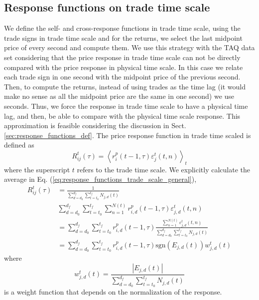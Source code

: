 \subsection{Response functions on trade time scale}
\label{subsec:response_function_trade}

We define the self- and cross-response functions in trade time scale, using the
trade signs in trade time scale and for the returns, we select the last
midpoint price of every second and compute them. We use this strategy with the
TAQ data set considering that the price response in trade time scale can not
be directly compared with the price response in physical time scale. In this
case we relate each trade sign in one second with the midpoint price of the
previous second. Then, to compute the returns, instead of using trades as the
time lag (it would make no sense as all the midpoint price are the same in one
second) we use seconds. Thus, we force the response in trade time scale to have
a physical time lag, and then, be able to compare with the physical time scale
response. This approximation is feasible considering the discussion in Sect.
\ref{sec:response_functions_def}. The price response function in trade time
scaled is defined as
\begin{equation}\label{eq:response_functions_trade_scale_general}
    R^{t}_{ij}\left(\tau\right)=\left\langle r^{p}_{i}\left(t-1,\tau
    \right)\varepsilon_{j}^{t} \left(t, n\right)\right\rangle _{t}
\end{equation}
where the superscript $t$ refers to the trade time scale. We explicitly
calculate the average in Eq. (\ref{eq:response_functions_trade_scale_general}),
\begin{align}\label{eq:response_trades_explicit}
    R_{ij}^{t}\left(\tau\right)&=\frac{1}{\sum_{d=d_{0}}^{d_{f}}
    \sum_{t=t_{0}}^{t_{f}}N_{j,d} \left(t \right)} \nonumber \\
    &\sum_{d=d_{0}}^{d_{f}}\sum_{t=t_{0}}^{t_{f}}\sum_{n=1}
    ^{N\left(t\right)} r^{p}_{i,d}\left(t-1, \tau\right)
    \varepsilon_{j,d}^{t}\left(t,n\right)\\
    &=\sum_{d=d_{0}}^{d_{f}}\sum_{t=t_{0}}^{t_{f}} r^{p}_{i,d}
    \left(t-1,\tau\right) \frac{\sum_{n=1}^{N\left(t\right)}
    \varepsilon_{j,d}^{t}\left(t,n \right)} {\sum_{d=d_{0}}^{d_{f}}
    \sum_{t=t_{0}}^{t_{f}}N_{j,d}\left(t\right)} \nonumber \\
    &=\sum_{d=d_{0}}^{d_{f}}\sum_{t=t_{0}}^{t_{f}}r^{p}_{i,d}
    \left(t-1,\tau\right) \text{sgn}\left(E_{j,d}\left(t\right)\right)
    w_{j,d}^{t}\left(t\right)
\end{align}
where
\begin{equation}\label{eq:trade_weight}
    w_{j,d}^{t}\left(t\right) = \frac{\left|E_{j,d}\left(t\right)\right|}
    {\sum_{d=d_{0}}^{d_{f}}\sum_{t=t_{0}}^{t_{f}}N_{j,d} \left(t\right)}
\end{equation}
is a weight function that depends on the normalization of the response.

